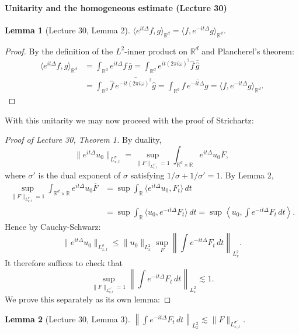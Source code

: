 \documentclass[UTF8,11pt]{ctexart}
\newtheorem*{lemma}{Lemma}
\theoremstyle{definition}
\newcommand{\R}{\mathbb R}
\begin{document}
\paragraph{Unitarity and the homogeneous estimate (Lecture 30)}
\begin{lemma}[Lecture 30, Lemma 2]
$\langle e^{it\Delta}f,g\rangle_{\R^d}=\langle f,e^{-it\Delta}g\rangle_{\R^d}$.
\end{lemma}
\begin{proof}
By the definition of the $L^2$-inner product on $\R^d$ and Plancherel's theorem:
\begin{align*}
\langle e^{it\Delta}f,g\rangle_{\R^d}&=\int_{\R^d}e^{it\Delta}f\,\overline g
=\int_{\R^d}e^{it(2\pi i\omega)^2}\widehat f\,\overline{\widehat g}\\
&=\int_{\R^d}\widehat f\,\overline{e^{-it(2\pi i\omega)^2}\widehat g}
=\int_{\R^d}f\,\overline{e^{-it\Delta}g}=\langle f,e^{-it\Delta}g\rangle_{\R^d}.
\end{align*}
\end{proof}
With this unitarity we may now proceed with the proof of Strichartz:
\begin{proof}[Proof of Lecture 30, Theorem 1]
By duality,
\[\|e^{it\Delta}u_0\|_{L^\sigma_{x,t}}=\sup_{\|F\|_{L^{\sigma'}_{x,t}}=1}\int_{\R^d\times\R}e^{it\Delta}u_0\overline F,\]
where $\sigma'$ is the dual exponent of $\sigma$ satisfying $1/\sigma+1/\sigma'=1$. By Lemma 2,
\begin{align*}
\sup_{\|F\|_{L^{\sigma'}_{x,t}}=1}\int_{\R^d\times\R}e^{it\Delta}u_0\overline F
&=\sup\int_\R\langle e^{it\Delta}u_0,F_t\rangle\,dt\\
&=\sup\int_\R\langle u_0,e^{-it\Delta}F_t\rangle\,dt
=\sup\left\langle u_0,\int e^{-it\Delta}F_t\,dt\right\rangle.
\end{align*}
Hence by Cauchy-Schwarz:
\[\|e^{it\Delta}u_0\|_{L^\sigma_{x,t}}\leq\|u_0\|_{L^2_x}\sup_F\left\|\int e^{-it\Delta}F_t\,dt\right\|_{L^2_x}.\]
It therefore suffices to check that
\[\sup_{\|F\|_{L^{\sigma'}_{x,t}}=1}\left\|\int e^{-it\Delta}F_t\,dt\right\|_{L^2_x}\lesssim1.\]
We prove this separately as its own lemma:
\end{proof}
\begin{lemma}[Lecture 30, Lemma 3]
$\left\|\int e^{-it\Delta}F_t\,dt\right\|_{L^2_x}\lesssim\|F\|_{L^{\sigma'}_{x,t}}$.
\end{lemma}
\end{document}
